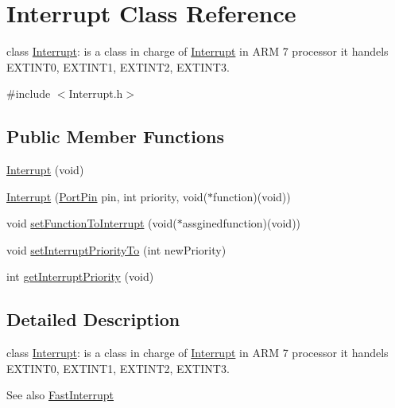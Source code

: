 \hypertarget{class_interrupt}{
\section{Interrupt Class Reference}
\label{da/dc3/class_interrupt}
}


class \hyperlink{class_interrupt}{Interrupt}: is a class in charge of \hyperlink{class_interrupt}{Interrupt} in ARM 7 processor it handels EXTINT0, EXTINT1, EXTINT2, EXTINT3.  




{\ttfamily \#include $<$Interrupt.h$>$}

\subsection*{Public Member Functions}
\begin{DoxyCompactItemize}
\item 
\hyperlink{class_interrupt_a2af932cad2bb12d21bcf6d3c65a7424b}{Interrupt} (void)
\item 
\hyperlink{group__group10_ga4fd8be38d92c8b0086b15b3c30ea1868}{Interrupt} (\hyperlink{class_port_pin}{PortPin} pin, int priority, void($\ast$function)(void))
\item 
void \hyperlink{group__group10_gafee631d8690407d619fe9ba2741b6c4d}{setFunctionToInterrupt} (void($\ast$assginedfunction)(void))
\item 
void \hyperlink{group__group10_ga4cd6bc79c3fa54378a156117de5f12a9}{setInterruptPriorityTo} (int newPriority)
\item 
int \hyperlink{group__group10_ga8d3124b3721e2426dc24fc8416f12e38}{getInterruptPriority} (void)
\end{DoxyCompactItemize}


\subsection{Detailed Description}
class \hyperlink{class_interrupt}{Interrupt}: is a class in charge of \hyperlink{class_interrupt}{Interrupt} in ARM 7 processor it handels EXTINT0, EXTINT1, EXTINT2, EXTINT3. 

\begin{DoxySeeAlso}{See also}
\hyperlink{class_fast_interrupt}{FastInterrupt} 
\end{DoxySeeAlso}


